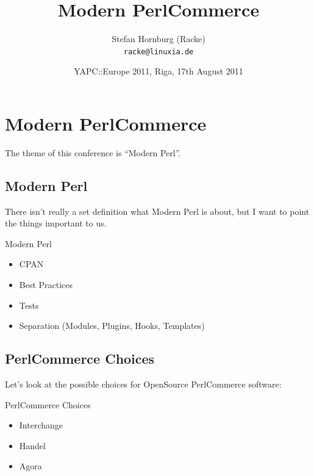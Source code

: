 
\usepackage[T1]{fontenc}
\usepackage{mathptmx}
\usepackage[scaled=.90]{helvet}
\usepackage{courier}

\usepackage{beamerthemesplit}
\usepackage{verbatim}
\usepackage{hyperref}
\usepackage{listings}
\lstset{language=Perl,basicstyle=\footnotesize,tabsize=3,showstringspaces=false}

\title{Modern PerlCommerce}
\author[racke]{Stefan Hornburg (Racke)\\ \texttt{racke@linuxia.de}}
\date[]{YAPC::Europe 2011, Riga, 17th August 2011}


\maketitle{}

\begin{frame}
  \titlepage
\end{frame}

\tableofcontents

\section{Modern PerlCommerce}
The theme of this conference is ``Modern Perl''.

\subsection{Modern Perl}
There isn't really a set definition what Modern Perl is about,
but I want to point the things important to us.

\begin{frame}{Modern Perl}
\begin{itemize}
\item CPAN
\item Best Practices
\item Tests
\item Separation (Modules, Plugins, Hooks, Templates)
\end{itemize}
\end{frame}

\subsection{PerlCommerce Choices}
Let's look at the possible choices for OpenSource PerlCommerce software:

\begin{frame}{PerlCommerce Choices}
\begin{itemize}
\item Interchange
\item Handel
\item Agora
\end{itemize}
\end{frame}

